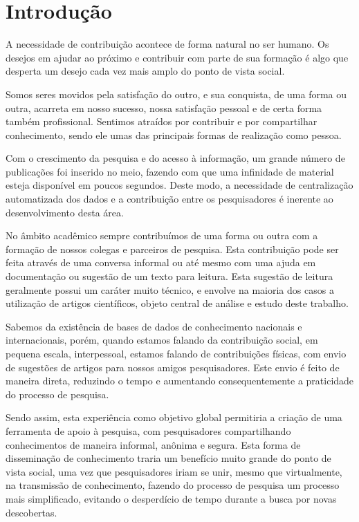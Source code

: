 
\chapter{Introdução}
\label{cha:introduction}

A necessidade de contribuição acontece de forma natural no ser humano. Os desejos em ajudar ao próximo e contribuir com parte de sua formação é algo que desperta um desejo cada vez mais amplo do ponto de vista social.

Somos seres movidos pela satisfação do outro, e sua conquista, de uma forma ou outra, acarreta em nosso sucesso, nossa satisfação pessoal e de certa forma também profissional. Sentimos atraídos por contribuir e por compartilhar conhecimento, sendo ele umas das principais formas de realização como pessoa.

Com o crescimento da pesquisa e do acesso à informação, um grande número de publicações foi inserido no meio, fazendo com que uma infinidade de material esteja disponível em poucos segundos. Deste modo, a necessidade de centralização automatizada dos dados e a contribuição entre os pesquisadores é inerente ao desenvolvimento desta área. 

No âmbito acadêmico sempre contribuímos de uma forma ou outra com a formação de nossos colegas e parceiros de pesquisa. Esta contribuição pode ser feita através de uma conversa informal ou até mesmo com uma ajuda em documentação ou sugestão de um texto para leitura. Esta sugestão de leitura geralmente possui um caráter muito técnico, e envolve na maioria dos casos a utilização de artigos científicos, objeto central de análise e estudo deste trabalho.

Sabemos da existência de bases de dados de conhecimento nacionais e internacionais, porém, quando estamos falando da contribuição social, em pequena escala, interpessoal, estamos falando de contribuições físicas, com envio de sugestões de artigos para nossos amigos pesquisadores. Este envio é feito de maneira direta, reduzindo o tempo e aumentando consequentemente a praticidade do processo de pesquisa.

Sendo assim, esta experiência como objetivo global permitiria a criação de uma ferramenta de apoio à pesquisa, com pesquisadores compartilhando conhecimentos de maneira informal, anônima e segura. Esta forma de disseminação de conhecimento traria um benefício muito grande do ponto de vista social, uma vez que pesquisadores iriam se unir, mesmo que virtualmente, na transmissão de conhecimento, fazendo do processo de pesquisa um processo mais simplificado, evitando o desperdício de tempo durante a busca por novas descobertas.

